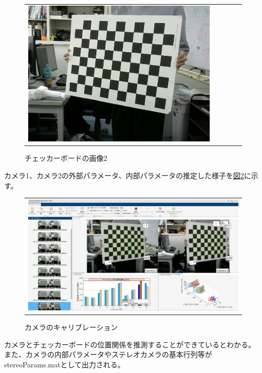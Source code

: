 \documentclass[]{jarticle}          %
\begin{document}
\begin{figure}[!ht]
\begin{center}
\begin{tabular}{ccccc}
      \includegraphics[keepaspectratio, scale=0.1]{figures/carib/camera2/10.png}\\
    \end{tabular}
  \end{center}
  \caption{チェッカーボードの画像2}
  \label{two}
\end{figure}
カメラ1、カメラ2の外部パラメータ、内部パラメータの推定した様子を\hyperref[three]{図\ref{three}}に示す。
\begin{figure}[!ht]
  \begin{center}
    \begin{tabular}{c}
      \includegraphics[keepaspectratio, scale=0.2]{figures/stereo.png}\\
    \end{tabular}
  \end{center}
  \caption{カメラのキャリブレーション}
  \label{three}
\end{figure}
カメラとチェッカーボードの位置関係を推測することができているとわかる。
また、カメラの内部パラメータやステレオカメラの基本行列等がstereoParams.matとして出力される。
\end{document}
